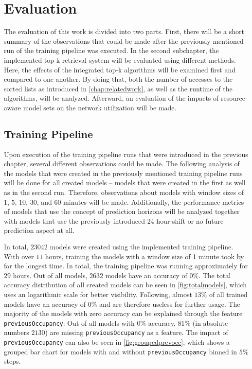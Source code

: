 \chapter{Evaluation} \label{chap:evaluation}

The evaluation of this work is divided into two parts. First, there will be a short summary of the observations that could be made after the previously mentioned run of the training pipeline was executed. In the second subchapter, the implemented top-k retrieval system will be evaluated using different methods. Here, the effects of the integrated top-k algorithms will be examined first and compared to one another. By doing that, both the number of accesses to the sorted lists as introduced in \autoref{chap:relatedwork}, as well as the runtime of the algorithms, will be analyzed. Afterward, an evaluation of the impacts of resource-aware model sets on the network utilization will be made.
  
  
  
  \section{Training Pipeline}
  
  Upon execution of the training pipeline runs that were introduced in the previous chapter, several different observations could be made. The following analysis of the models that were created in the previously mentioned training pipeline runs will be done for all created models – models that were created in the first as well as in the second run. Therefore, observations about models with window sizes of 1, 5, 10, 30, and 60 minutes will be made. Additionally, the performance metrics of models that use the concept of prediction horizons will be analyzed together with models that use the previously introduced 24 hour-shift or no future prediction aspect at all.

  In total, $23042$ models were created using the implemented training pipeline. With over $11$ hours, training the models with a window size of 1 minute took by far the longest time. In total, the training pipeline was running approximately for $29$ hours. Out of all models, $2632$ models have an accuracy of $0\%$. The total accuracy distribution of all created models can be seen in \autoref{fig:totalmodels}, which uses an logarithmic scale for better visibility. Following, almost $13\%$ of all trained models have an accuracy of $0\%$ and are therefore useless for further usage. The majority of the models with zero accuracy can be explained through the feature \texttt{previousOccupancy}: Out of all models with $0\%$ accuracy, $81\%$ (in absolute numbers $2130$) are missing \texttt{previousOccupancy} as a feature. The impact of \texttt{previousOccupancy} can also be seen in \autoref{fig:groupedprevocc}, which shows a grouped bar chart for models with and without \texttt{previousOccupancy} binned in $5\%$ steps.

